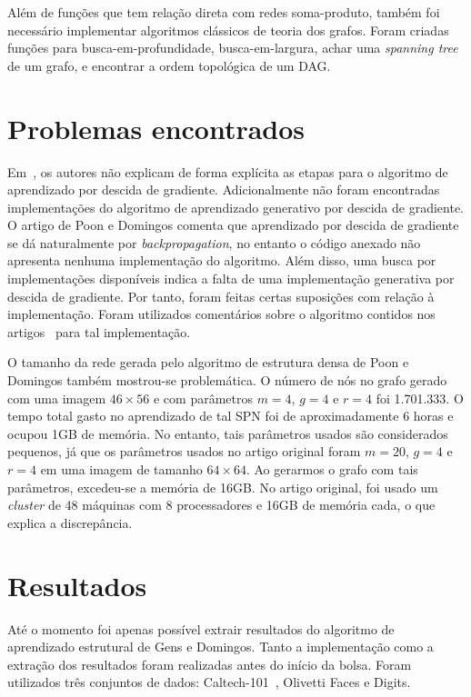 \documentclass[12pt]{article}
\theoremstyle{plain}
\numberwithin{equation}{section}
\begin{document}
Além de funções que tem relação direta com redes soma-produto, também foi necessário implementar
algoritmos clássicos de teoria dos grafos. Foram criadas funções para busca-em-profundidade,
busca-em-largura, achar uma \textit{spanning tree} de um grafo, e encontrar a ordem topológica de
um DAG\@.

\section{Problemas encontrados}

Em~\cite{poon-domingos}, os autores não explicam de forma explícita as etapas para o algoritmo de
aprendizado por descida de gradiente. Adicionalmente não foram encontradas implementações do
algoritmo de aprendizado generativo por descida de gradiente. O artigo de Poon e Domingos comenta
que aprendizado por descida de gradiente se dá naturalmente por
\textit{backpropagation}\cite{poon-domingos}, no entanto o código anexado não apresenta nenhuma
implementação do algoritmo. Além disso, uma busca por implementações disponíveis indica a falta
de uma implementação generativa por descida de gradiente. Por tanto, foram feitas certas suposições
com relação à implementação. Foram utilizados comentários sobre o algoritmo contidos nos
artigos~\cite{poon-domingos,discriminative} para tal implementação.

O tamanho da rede gerada pelo algoritmo de estrutura densa de Poon e Domingos também mostrou-se
problemática. O número de nós no grafo gerado com uma imagem $46\times 56$ e com parâmetros $m=4$,
$g=4$ e $r=4$ foi 1.701.333. O tempo total gasto no aprendizado de tal SPN foi de aproximadamente 6
horas e ocupou 1GB de memória. No entanto, tais parâmetros usados são considerados pequenos, já que
os parâmetros usados no artigo original foram $m=20$, $g=4$ e $r=4$ em uma imagem de tamanho
$64\times 64$. Ao gerarmos o grafo com tais parâmetros, excedeu-se a memória de 16GB\@. No artigo
original, foi usado um \textit{cluster} de 48 máquinas com 8 processadores e 16GB de memória cada,
o que explica a discrepância.

\section{Resultados}

Até o momento foi apenas possível extrair resultados do algoritmo de aprendizado estrutural de Gens
e Domingos. Tanto a implementação como a extração dos resultados foram realizadas antes do início
da bolsa. Foram utilizados três conjuntos de dados: Caltech-101~\cite{caltech101}, Olivetti Faces e
Digits.
\end{document}
